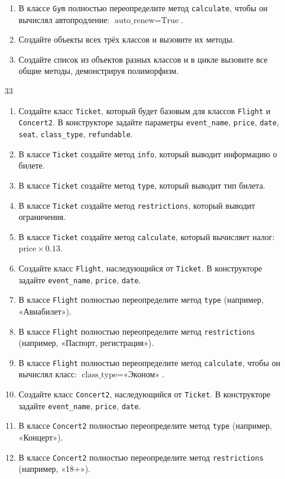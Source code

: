 \begin{enumerate}
\begin{enumerate}[leftmargin=*]
    \item В классе \texttt{Gym} полностью переопределите метод \texttt{calculate}, чтобы он вычислял автопродление: \( \text{auto\_renew} = \text{True} \).
    \item Создайте объекты всех трёх классов и вызовите их методы.
    \item Создайте список из объектов разных классов и в цикле вызовите все общие методы, демонстрируя полиморфизм.
\end{enumerate}
\item[33]
\begin{enumerate}[leftmargin=*]
    \item Создайте класс \texttt{Ticket}, который будет базовым для классов \texttt{Flight} и \texttt{Concert2}. В конструкторе задайте параметры \texttt{event\_name}, \texttt{price}, \texttt{date}, \texttt{seat}, \texttt{class\_type}, \texttt{refundable}.
    \item В классе \texttt{Ticket} создайте метод \texttt{info}, который выводит информацию о билете.
    \item В классе \texttt{Ticket} создайте метод \texttt{type}, который выводит тип билета.
    \item В классе \texttt{Ticket} создайте метод \texttt{restrictions}, который выводит ограничения.
    \item В классе \texttt{Ticket} создайте метод \texttt{calculate}, который вычисляет налог: \( \text{price} \times 0.13 \).
    \item Создайте класс \texttt{Flight}, наследующийся от \texttt{Ticket}. В конструкторе задайте \texttt{event\_name}, \texttt{price}, \texttt{date}.
    \item В классе \texttt{Flight} полностью переопределите метод \texttt{type} (например, «Авиабилет»).
    \item В классе \texttt{Flight} полностью переопределите метод \texttt{restrictions} (например, «Паспорт, регистрация»).
    \item В классе \texttt{Flight} полностью переопределите метод \texttt{calculate}, чтобы он вычислял класс: \( \text{class\_type} = \text{«Эконом»} \).
    \item Создайте класс \texttt{Concert2}, наследующийся от \texttt{Ticket}. В конструкторе задайте \texttt{event\_name}, \texttt{price}, \texttt{date}.
    \item В классе \texttt{Concert2} полностью переопределите метод \texttt{type} (например, «Концерт»).
    \item В классе \texttt{Concert2} полностью переопределите метод \texttt{restrictions} (например, «18+»).

\end{enumerate}
\end{enumerate}

